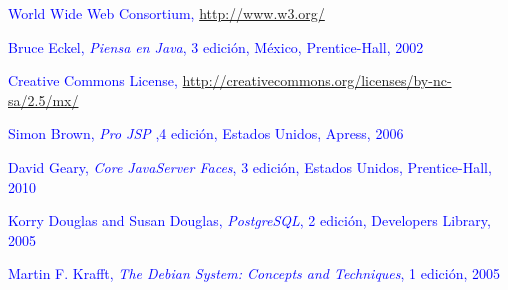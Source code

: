 \documentclass[11pt,letterpaper,titlepage]{article}
\begin{document}
\begin{thebibliography}{99}
 \textcolor{blue}{World Wide Web Consortium, \href{http://www.w3.org/}{http://www.w3.org/}}

 \textcolor{blue}{Bruce Eckel, \textit{Piensa en Java}, 3 edici\'on, M\'exico, Prentice-Hall, 2002}


 \textcolor{blue}{Creative Commons License, \href{http://creativecommons.org/licenses/by-nc-sa/2.5/mx/}{http://creativecommons.org/licenses/by-nc-sa/2.5/mx/}}


 \textcolor{blue}{Simon Brown, \textit{Pro JSP} ,4 edici\'on, Estados Unidos, Apress, 2006}

 \textcolor{blue}{David Geary, \textit{Core JavaServer Faces}, 3 edici\'on, Estados Unidos, Prentice-Hall, 2010}

 \textcolor{blue}{Korry Douglas and Susan Douglas, \textit{PostgreSQL}, 2 edici\'on, Developers Library, 2005}


 \textcolor{blue}{Martin F. Krafft, \textit{The Debian System: Concepts and Techniques}, 1 edici\'on, 2005}
                      


% 

\end{thebibliography}
\end{document}
